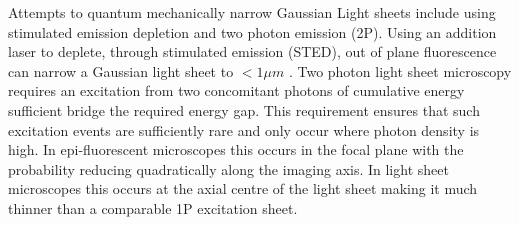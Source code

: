 Attempts to quantum mechanically narrow Gaussian Light sheets include using stimulated emission depletion and two photon emission (2P).
Using an addition laser to deplete, through stimulated emission (STED), out of plane fluorescence can narrow a Gaussian light sheet to $<1 \mu m$ \cite{friedrich_sted-spim:_2011}.
Two photon light sheet microscopy requires an excitation from two concomitant photons of cumulative energy sufficient bridge the required energy gap.
This requirement ensures that such excitation events are sufficiently rare and only occur where photon density is high.
In epi-fluorescent microscopes this occurs in the focal plane with the probability reducing quadratically along the imaging axis.
In light sheet microscopes this occurs at the axial centre of the light sheet making it much thinner than a comparable 1P excitation sheet.


